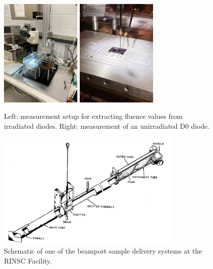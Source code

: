 \begin{figure}[!hbt]
  \begin{center}
    \includegraphics[width=0.35\textwidth]{figures/CVIV_Setup}
    \includegraphics[width=0.35\textwidth]{figures/D0_Measurement}
    \caption{Left: measurement setup for extracting fluence values from irradiated diodes. Right: measurement of an unirradiated D0 diode.}
    \label{fig:Fluence_Measurement_Setup}
  \end{center}
\end{figure}

\begin{figure}[!hbt]
  \begin{center}
    \includegraphics[width=0.80\textwidth]{figures/Beamport_Schematic}
    \caption{Schematic of one of the beamport sample delivery systems at the RINSC Facility.}
    \label{fig:Beamport_Schematic}
  \end{center}
\end{figure}

\fi       %
